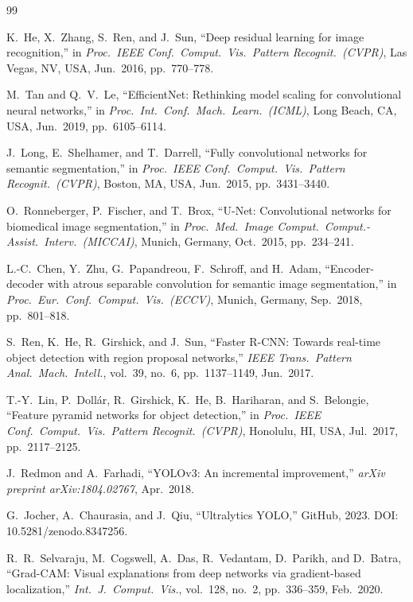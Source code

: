 \documentclass[12pt,a4paper]{article}
\begin{document}
\newpage
\begin{thebibliography}{99}

K.~He, X.~Zhang, S.~Ren, and J.~Sun,
``Deep residual learning for image recognition,''
in \textit{Proc.\ IEEE Conf.\ Comput.\ Vis.\ Pattern Recognit.\ (CVPR)},
Las Vegas, NV, USA, Jun.\ 2016, pp.\ 770--778.

M.~Tan and Q.~V.~Le,
``EfficientNet: Rethinking model scaling for convolutional neural networks,''
in \textit{Proc.\ Int.\ Conf.\ Mach.\ Learn.\ (ICML)},
Long Beach, CA, USA, Jun.\ 2019, pp.\ 6105--6114.

J.~Long, E.~Shelhamer, and T.~Darrell,
``Fully convolutional networks for semantic segmentation,''
in \textit{Proc.\ IEEE Conf.\ Comput.\ Vis.\ Pattern Recognit.\ (CVPR)},
Boston, MA, USA, Jun.\ 2015, pp.\ 3431--3440.

O.~Ronneberger, P.~Fischer, and T.~Brox,
``U-Net: Convolutional networks for biomedical image segmentation,''
in \textit{Proc.\ Med.\ Image Comput.\ Comput.-Assist.\ Interv.\ (MICCAI)},
Munich, Germany, Oct.\ 2015, pp.\ 234--241.

L.-C.~Chen, Y.~Zhu, G.~Papandreou, F.~Schroff, and H.~Adam,
``Encoder-decoder with atrous separable convolution for semantic image segmentation,''
in \textit{Proc.\ Eur.\ Conf.\ Comput.\ Vis.\ (ECCV)},
Munich, Germany, Sep.\ 2018, pp.\ 801--818.

S.~Ren, K.~He, R.~Girshick, and J.~Sun,
``Faster R-CNN: Towards real-time object detection with region proposal networks,''
\textit{IEEE Trans.\ Pattern Anal.\ Mach.\ Intell.},
vol.\ 39, no.\ 6, pp.\ 1137--1149, Jun.\ 2017.

T.-Y.~Lin, P.~Doll{\'a}r, R.~Girshick, K.~He, B.~Hariharan, and S.~Belongie,
``Feature pyramid networks for object detection,''
in \textit{Proc.\ IEEE Conf.\ Comput.\ Vis.\ Pattern Recognit.\ (CVPR)},
Honolulu, HI, USA, Jul.\ 2017, pp.\ 2117--2125.

J.~Redmon and A.~Farhadi,
``YOLOv3: An incremental improvement,''
\textit{arXiv preprint arXiv:1804.02767}, Apr.\ 2018.

G.~Jocher, A.~Chaurasia, and J.~Qiu,
``Ultralytics YOLO,''
GitHub, 2023.
DOI: 10.5281/zenodo.8347256.

R.~R.~Selvaraju, M.~Cogswell, A.~Das, R.~Vedantam, D.~Parikh, and D.~Batra,
``Grad-CAM: Visual explanations from deep networks via gradient-based localization,''
\textit{Int.\ J.\ Comput.\ Vis.},
vol.\ 128, no.\ 2, pp.\ 336--359, Feb.\ 2020.


\end{thebibliography}
\end{document}
